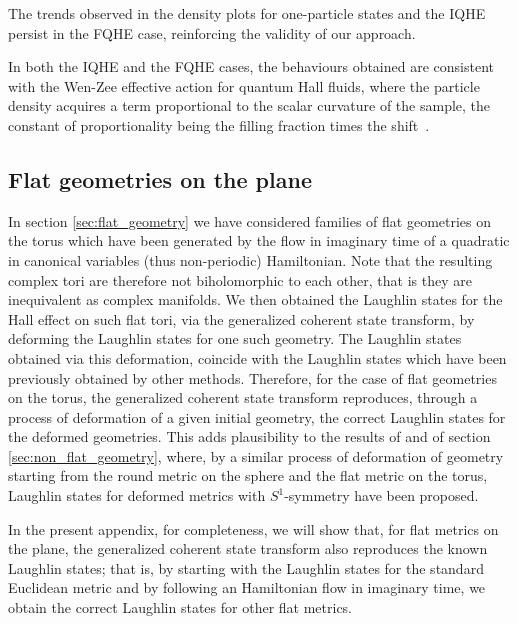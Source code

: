 \documentclass[a4paper,11pt]{article}
\begin{document}
The trends observed in the density plots for one-particle states and the IQHE persist in the FQHE case, reinforcing the validity of our approach.

In both the IQHE and the FQHE cases, the behaviours obtained are consistent with the Wen-Zee effective action for quantum Hall fluids, where the particle density acquires a term proportional to the scalar curvature of the sample, the constant of proportionality being the filling fraction times the shift~\cite{wen:zee:1992, read:2009,read:rezayi:2011}.





\newpage 




\begin{appendices}
    
\section{Flat geometries on the plane}
\label{section:flatgeometriesplane}




In section \ref{sec:flat_geometry} we have considered families of flat geometries on the torus which have been generated by the flow in imaginary time of a quadratic in canonical variables (thus non-periodic) Hamiltonian. Note that the resulting complex tori are therefore not biholomorphic to each other, that is they are inequivalent as complex manifolds. We then obtained the Laughlin states for the Hall effect on such flat tori, via the generalized coherent state transform, by deforming the Laughlin states for one such geometry. The Laughlin states obtained via this deformation, coincide with the Laughlin states which have been previously obtained by other methods. Therefore, for the case of flat geometries on the torus, the generalized coherent state transform reproduces, through a process of deformation of a given initial geometry, the correct Laughlin states for the deformed geometries.
This adds plausibility to the results of \cite{matos:mera:mourao:mourao:nunes:2023} and of section \ref{sec:non_flat_geometry}, where, by a similar process of deformation of geometry starting from the round metric on the sphere and the flat metric on the torus, Laughlin states for deformed metrics  with $S^1$-symmetry have been proposed. 

In the present appendix, for completeness, we will show that, for flat metrics on the plane, the generalized coherent state transform also reproduces the known Laughlin states; that is, by starting with the Laughlin states for the standard Euclidean metric and by following an Hamiltonian flow in imaginary time, we obtain the correct Laughlin states for other flat metrics.


\end{appendices}
\end{document}
